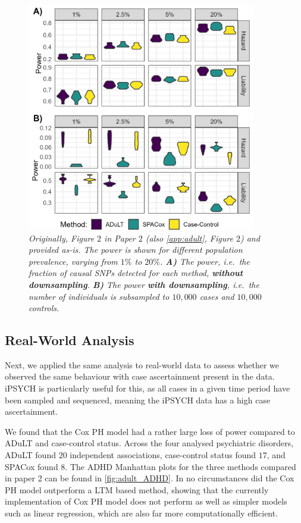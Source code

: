 \begin{figure}[h]
	\centering
	\includegraphics[width=10cm]{results/adult_combined_C250_power}
	\caption[Power simulation results with $ 250 $ causal SNPs under both generative models and varying prevalences.]{\sl Originally, Figure $ 2 $ in Paper $ 2 $\cite{pedersen2022adult} (also \cref{app:adult}, Figure $ 2 $) and provided as-is. The power is shown for different population prevalence, varying from $ 1\% $ to $ 20\% $. \textbf{A)} The power, i.e.\ the fraction of causal SNPs detected for each method, \textbf{without downsampling}. \textbf{B)} The power \textbf{with downsampling}, i.e.\ the number of individuals is subsampled to $ 10,000 $ cases and $ 10,000 $ controls.}
	\label{fig:adult_simulations}
\end{figure}


\subsection{Real-World Analysis}
Next, we applied the same analysis to real-world data to assess whether we observed the same behaviour with case ascertainment present in the data. iPSYCH is particularly useful for this, as all cases in a given time period have been sampled and sequenced, meaning the iPSYCH data has a high case ascertainment.

We found that the Cox PH model had a rather large loss of power compared to ADuLT and case-control status. Across the four analysed psychiatric disorders, ADuLT found $ 20 $ independent associations, case-control status found $ 17 $, and SPACox found $ 8 $. The ADHD Manhattan plots for the three methods compared in paper 2 can be found in \cref{fig:adult_ADHD}. In no circumstances did the Cox PH model outperform a LTM based method, showing that the currently implementation of Cox PH model does not perform as well as simpler models such as linear regression, which are also far more computationally efficient.


